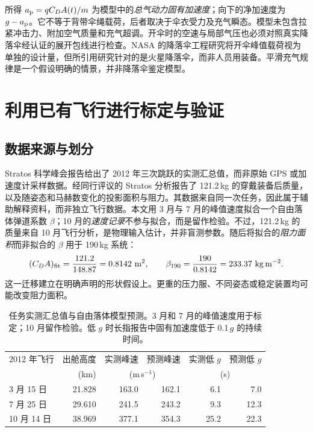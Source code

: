 \documentclass[11pt,a4paper]{article}
\begin{document}
所得 $a_{\rm p}=q C_DA(t)/m$ 为模型中的\emph{总气动力固有加速度}；向下的净加速度为 $g-a_{\rm p}$。它不等于背带伞绳载荷，后者取决于伞衣受力及充气瞬态。模型未包含拉紧冲击力、附加空气质量和充气超调。开伞时的空速与局部气压也必须对照真实降落伞经认证的展开包线进行检查。NASA 的降落伞工程研究将开伞峰值载荷视为单独的设计量，但所引用研究针对的是火星降落伞，而非人员用装备\cite{nasaopen}。平滑充气规律是一个假设明确的情景，并非降落伞鉴定模型。

\section{利用已有飞行进行标定与验证}
\subsection{数据来源与划分}
Stratos 科学峰会报告给出了 2012 年三次跳跃的实测汇总值\cite{stratos}，而非原始 GPS 或加速度计采样数据。经同行评议的 Stratos 分析报告了 121.2\,kg 的穿戴装备后质量，以及随姿态和马赫数变化的投影面积与阻力\cite{guerster}。其数据来自同一次任务，因此属于辅助解释资料，而非独立飞行数据。本文用 3 月与 7 月的峰值速度拟合一个自由落体弹道系数 $\beta$；10 月的\emph{速度记录}不参与拟合，而是留作检验。不过，121.2\,kg 的质量来自 10 月飞行分析，是物理输入估计，并非盲测参数。随后将拟合的\emph{阻力面积}而非拟合的 $\beta$ 用于 190\,kg 系统：
\begin{equation}
(C_DA)_{\rm fit}=\frac{121.2}{148.87}=0.8142~{\rm m^2},
\qquad
\beta_{190}=\frac{190}{0.8142}=233.37~{\rm kg\,m^{-2}}.
\label{eq:transfer}
\end{equation}
这一迁移建立在明确声明的形状假设上。更重的压力服、不同姿态或稳定装置均可能改变阻力面积。

\begin{table}[H]\centering\small
\caption{任务实测汇总值与自由落体模型预测。3 月和 7 月的峰值速度用于标定；10 月留作检验。低 $g$ 时长指报告中固有加速度低于 0.1\,$g$ 的持续时间。}
\label{tab:validation}
\begin{tabular}{lrrrrr}\toprule
2012 年飞行 & 出舱高度 & 实测峰速 & 预测峰速 & 实测低 $g$ & 预测低 $g$\\
 & (km) & \multicolumn{2}{c}{(m\,s$^{-1}$)} & \multicolumn{2}{c}{(s)}\\\midrule
3 月 15 日 & 21.828 & 163.0 & 162.1 & 6.1 & 7.0\\
7 月 25 日 & 29.610 & 241.5 & 243.2 & 9.3 & 12.3\\
10 月 14 日 & 38.969 & 377.1 & 354.3 & 25.2 & 22.3\\\bottomrule
\end{tabular}
\end{table}
\end{document}
